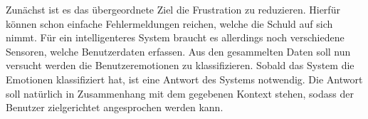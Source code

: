 Zunächst ist es das übergeordnete Ziel die Frustration zu reduzieren. Hierfür können schon einfache Fehlermeldungen reichen, welche die Schuld auf sich nimmt. Für ein intelligenteres System braucht es allerdings noch verschiedene Sensoren, welche Benutzerdaten erfassen. Aus den gesammelten Daten soll nun versucht werden die Benutzeremotionen zu klassifizieren. Sobald das System die Emotionen klassifiziert hat, ist eine Antwort des Systems notwendig. Die Antwort soll natürlich in Zusammenhang mit dem gegebenen Kontext stehen, sodass der Benutzer zielgerichtet angesprochen werden kann.

